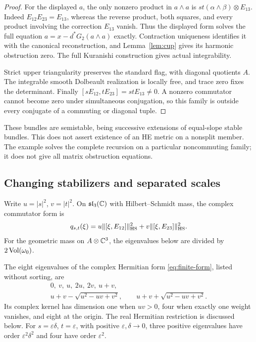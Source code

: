 \begin{proof}
For the displayed $a$, the only nonzero product
in $a\wedge a$ is
$st(\alpha\wedge\beta)\otimes E_{13}$.
Indeed $E_{12}E_{23}=E_{13}$, whereas the reverse
product, both squares, and every product involving
the correction $E_{13}$ vanish. Thus the displayed
form solves the full equation
$a=x-d^*G_2(a\wedge a)$ exactly. Contraction
uniqueness identifies it with the canonical
reconstruction, and Lemma~\ref{lem:cup} gives its
harmonic obstruction zero. The full Kuranishi
construction gives actual integrability.

Strict upper triangularity preserves the standard
flag, with diagonal quotients $A$. The integrable
smooth Dolbeault realization is locally free, and
trace zero fixes the determinant. Finally
$[sE_{12},tE_{23}]=stE_{13}\ne0$. A nonzero
commutator cannot become zero under simultaneous
conjugation, so this family is outside every
conjugate of a commuting or diagonal tuple.
\end{proof}

These bundles are semistable, being successive
extensions of equal-slope stable bundles. This
does not assert existence of an HE metric on a
nonsplit member. The example solves the complete
recursion on a particular noncommuting family;
it does not give all matrix obstruction equations.

\subsection{Changing stabilizers and separated scales}
Write $u=|s|^2$, $v=|t|^2$. On
$\mathfrak{sl}_3(\mathbb C)$ with Hilbert--Schmidt mass,
the complex commutator form is
\begin{equation}\label{eq:finite-form}
 q_{s,t}(\xi)
      =u\|[\xi,E_{12}]\|_{\mathrm{HS}}^2
           +v\|[\xi,E_{23}]\|_{\mathrm{HS}}^2.
\end{equation}
For the geometric mass on $A\otimes\mathbb C^3$,
the eigenvalues below are divided by
$2\operatorname{Vol}(\omega_0)$.

\begin{proposition}\label{prop:finite-spectrum}
The eight eigenvalues of the complex Hermitian
form \eqref{eq:finite-form}, listed without
sorting, are
\begin{equation}\label{eq:eigenvalues}
 \begin{gathered}
 0,\ v,\ u,\ 2u,\ 2v,\ u+v,\\
 u+v-\sqrt{u^2-uv+v^2},\qquad
 u+v+\sqrt{u^2-uv+v^2}.
 \end{gathered}
\end{equation}
Its complex kernel has dimension one when
$uv>0$, four when exactly one weight vanishes,
and eight at the origin.
The real Hermitian restriction is discussed below.
For $s=\varepsilon\delta$, $t=\varepsilon$,
with positive $\varepsilon,\delta\to0$, three
positive eigenvalues have order
$\varepsilon^2\delta^2$ and four have order
$\varepsilon^2$.
\end{proposition}

